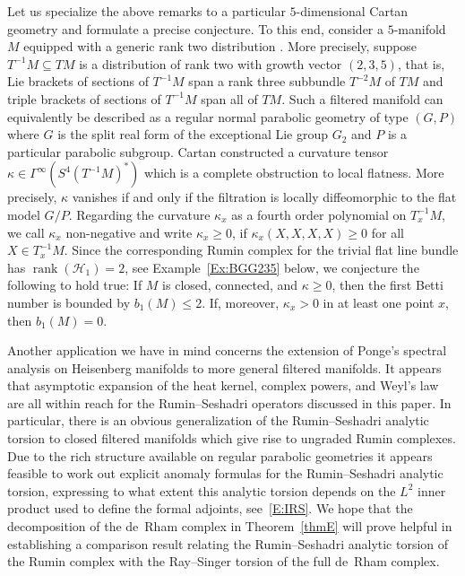 \documentclass[reqno,12pt]{amsart}
\DeclareMathOperator{\rank}{rank}
\theoremstyle{plain}
\theoremstyle{definition}
\begin{document}
Let us specialize the above remarks to a particular $5$-dimensional Cartan geometry and formulate a precise conjecture.
To this end, consider a $5$-manifold $M$ equipped with a generic rank two distribution \cite{C10,BH93,S08}.
More precisely, suppose $T^{-1}M\subseteq TM$ is a distribution of rank two with growth vector $(2,3,5)$, that is, Lie brackets of sections of $T^{-1}M$ span a rank three subbundle $T^{-2}M$ of $TM$ and triple brackets of sections of $T^{-1}M$ span all of $TM$.
Such a filtered manifold can equivalently be described as a regular normal parabolic geometry of type $(G,P)$ where $G$ is the split real form of the exceptional Lie group $G_2$ and $P$ is a particular parabolic subgroup.
Cartan \cite{C10} constructed a curvature tensor $\kappa\in\Gamma^\infty(S^4(T^{-1}M)^*)$ which is a complete obstruction to local flatness.
More precisely, $\kappa$ vanishes if and only if the filtration is locally diffeomorphic to the flat model $G/P$.
Regarding the curvature $\kappa_x$ as a fourth order polynomial on $T^{-1}_xM$, we call $\kappa_x$ non-negative and write $\kappa_x\geq0$, if $\kappa_x(X,X,X,X)\geq0$ for all $X\in T_x^{-1}M$.
Since the corresponding Rumin complex for the trivial flat line bundle has $\rank(\mathcal H_1)=2$, see Example~\ref{Ex:BGG235} below, we conjecture the following to hold true:
If $M$ is closed, connected, and $\kappa\geq0$, then the first Betti number is bounded by $b_1(M)\leq2$. 
If, moreover, $\kappa_x>0$ in at least one point $x$, then $b_1(M)=0$.


Another application we have in mind concerns the extension of Ponge's \cite{P08} spectral analysis on Heisenberg manifolds to more general filtered manifolds.
It appears that asymptotic expansion of the heat kernel, complex powers, and Weyl's law are all within reach for the Rumin--Seshadri operators discussed in this paper.
In particular, there is an obvious generalization of the Rumin--Seshadri analytic torsion \cite{RS12} to closed filtered manifolds which give rise to ungraded Rumin complexes.
Due to the rich structure available on regular parabolic geometries it appears feasible to work out explicit anomaly formulas for the Rumin--Seshadri analytic torsion, expressing to what extent this analytic torsion depends on the $L^2$ inner product used to define the formal adjoints, see~\eqref{E:IRS}.
We hope that the decomposition of the de~Rham complex in Theorem~\ref{thmE} will prove helpful in establishing a comparison result relating the Rumin--Seshadri analytic torsion of the Rumin complex with the Ray--Singer torsion \cite{RS71} of the full de~Rham complex.
\end{document}
